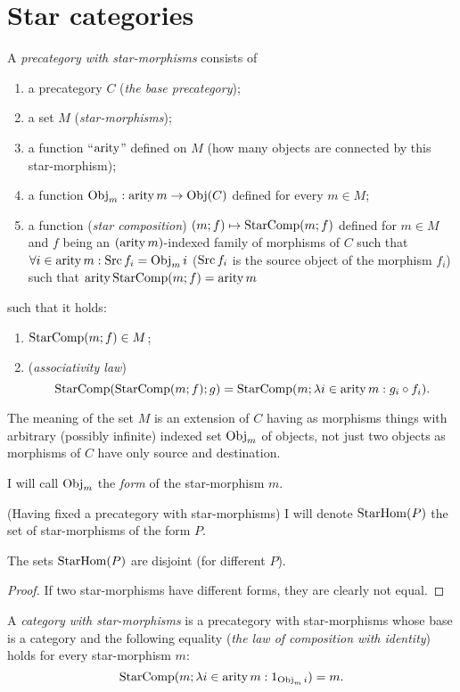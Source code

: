 \section{Star categories}
\begin{defn}
A
\emph{precategory with star-morphisms} consists of
\begin{enumerate}
\item a precategory $C$ (\emph{the base precategory});
\item {}a set $M$ (\emph{star-morphisms});
\item a function ``$\operatorname{arity}$'' defined on $M$ (how many objects are connected
by this star-morphism);
\item a function $\operatorname{Obj}_{m}:\operatorname{arity} m\rightarrow\operatorname{Obj}(C)$ defined for every
$m\in M$;
\item {}a function (\emph{star composition}) $(m;f)\mapsto\operatorname{StarComp}(m;f)$
defined for $m\in M$ and $f$ being an $(\operatorname{arity} m)$-indexed family
of morphisms of $C$ such that $\forall i\in\operatorname{arity} m:\operatorname{Src} f_{i}=\operatorname{Obj}_{m}i$
($\operatorname{Src} f_{i}$ is the source object of the morphism $f_{i}$) such
that $\operatorname{arity}\operatorname{StarComp}(m;f)=\operatorname{arity} m$
\end{enumerate}
such that it holds:
\begin{enumerate}
\item $\operatorname{StarComp}(m;f)\in M$;
\item (\emph{associativity law}) 
\[
\operatorname{StarComp}(\operatorname{StarComp}(m;f);g)=\operatorname{StarComp}(m;\lambda i\in\operatorname{arity} m:g_{i}\circ f_{i}).
\]

\end{enumerate}
\end{defn}
The meaning of the set $M$ is an extension of $C$ having as morphisms
things with arbitrary (possibly infinite) indexed set $\operatorname{Obj}_{m}$
of objects, not just two objects as morphisms of $C$ have only source
and destination.
\begin{defn}
I will call $\operatorname{Obj}_{m}$ the \emph{form}
of the star-morphism $m$.
\end{defn}
(Having fixed a precategory with star-morphisms) I will denote $\operatorname{StarHom}(P)$
the set of star-morphisms of the form $P$.
\begin{prop}
The sets $\operatorname{StarHom}(P)$ are disjoint (for different $P$).\end{prop}
\begin{proof}
If two star-morphisms have different forms, they are clearly not equal.\end{proof}
\begin{defn}
A \emph{category with star-morphisms}
is a precategory with star-morphisms whose base is a category and
the following equality (\emph{the law of composition with identity})
holds for every star-morphism $m$:
\[
\operatorname{StarComp}(m;\lambda i\in\operatorname{arity} m:1_{\operatorname{Obj}_{m}i})=m.
\]

\end{defn}

